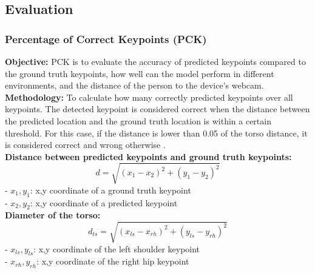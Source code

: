\documentclass[12pt]{article}
\begin{document}
\clearpage
\subsection{Evaluation}

\subsubsection{Percentage of Correct Keypoints (PCK)}

\hspace*{1.5em}\textbf{Objective:} PCK is to evaluate the accuracy of predicted keypoints compared to the ground truth keypoints, how well can the model perform in different environments, and the distance of the person to the device’s webcam.\\

\textbf{Methodology:} To calculate how many correctly predicted keypoints over all keypoints. The detected keypoint is considered correct when the distance between the predicted location and the ground truth location is within a certain threshold. For this case, if the distance is lower than 0.05 of the torso distance, it is considered correct and wrong otherwise \cite{chung2022}.\\

\textbf{Distance between predicted keypoints and ground truth keypoints:}
\[
    d = \sqrt{(x_1 - x_2)^2 + (y_1 - y_2)^2}
\]
- \(x_1, y_1\): x,y coordinate of a ground truth keypoint\\
- \(x_2, y_2\): x,y coordinate of a predicted keypoint\\

\textbf{Diameter of the torso:}
\[
    d_{ts} = \sqrt{(x_{ls} - x_{rh})^2 + (y_{ls} - y_{rh})^2}
\]
- \(x_{ls}, y_{ls}\): x,y coordinate of the left shoulder keypoint\\
- \(x_{rh}, y_{rh}\): x,y coordinate of the right hip keypoint\\
\end{document}
